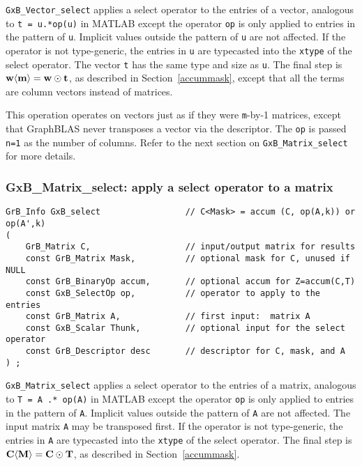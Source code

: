 \documentclass[12pt]{article}
\begin{document}
\verb'GxB_Vector_select' applies a select operator to the entries of a vector,
analogous to \verb't = u.*op(u)'  in MATLAB except the operator \verb'op' is
only applied to entries in the pattern of \verb'u'.  Implicit values outside
the pattern of \verb'u' are not affected.  If the operator is not type-generic,
the entries in \verb'u' are typecasted into the \verb'xtype' of the select
operator.  The vector \verb't' has the same type and size as \verb'u'.  The
final step is ${\bf w \langle m \rangle  = w \odot t}$, as described in
Section~\ref{accummask}, except that all the terms are column vectors instead
of matrices.

This operation operates on vectors just as if they were \verb'm'-by-1 matrices,
except that GraphBLAS never transposes a vector via the descriptor.  The
\verb'op' is passed \verb'n=1' as the number of columns.  Refer to the next
section on \verb'GxB_Matrix_select' for more details.

\newpage
\subsubsection{{\sf GxB\_Matrix\_select:} apply a select operator to a matrix}
\label{select_matrix}

\begin{mdframed}[userdefinedwidth=6in]
{\footnotesize
\begin{verbatim}
GrB_Info GxB_select                 // C<Mask> = accum (C, op(A,k)) or op(A',k)
(
    GrB_Matrix C,                   // input/output matrix for results
    const GrB_Matrix Mask,          // optional mask for C, unused if NULL
    const GrB_BinaryOp accum,       // optional accum for Z=accum(C,T)
    const GxB_SelectOp op,          // operator to apply to the entries
    const GrB_Matrix A,             // first input:  matrix A
    const GxB_Scalar Thunk,         // optional input for the select operator
    const GrB_Descriptor desc       // descriptor for C, mask, and A
) ;
\end{verbatim} } \end{mdframed}

\verb'GxB_Matrix_select' applies a select operator to the entries of a matrix,
analogous to \verb'T = A .* op(A)'  in MATLAB except the operator \verb'op' is
only applied to entries in the pattern of \verb'A'.  Implicit values outside
the pattern of \verb'A' are not affected.  The input matrix \verb'A' may be
transposed first.  If the operator is not type-generic, the entries in \verb'A'
are typecasted into the \verb'xtype' of the select operator.  The final step is
${\bf C \langle M \rangle  = C \odot T}$, as described in
Section~\ref{accummask}.
\end{document}

